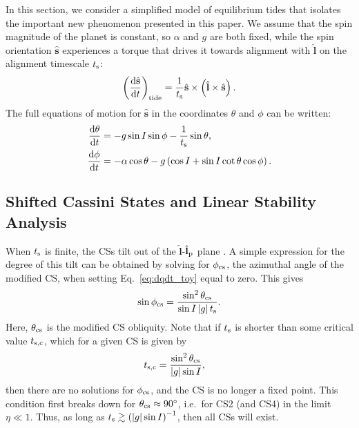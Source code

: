 \documentclass[
        fleqn,
        usenatbib,
    ]{mnras}
\newcommand*{\rd}[2]{\frac{\mathrm{d}#1}{\mathrm{d}#2}}
\newcommand*{\abs}[1]{\left|#1\right|}
\newcommand*{\p}[1]{\left(#1\right)}
\newcommand*{\uv}[1]{\hat{\mathbf{#1}}}
\begin{document}
In this section, we consider a simplified model of equilibrium tides that
isolates the important new phenomenon presented in this paper. We assume that
the spin magnitude of the planet is constant, so $\alpha$ and $g$ are both
fixed, while the spin orientation $\uv{s}$ experiences a torque that drives it
towards alignment with $\uv{l}$ on the alignment timescale $t_{\rm s}$:
\begin{equation}
    \p{\rd{\uv{s}}{t}}_{\rm tide}
        = \frac{1}{t_{\rm s}} \uv{s} \times \p{\uv{l} \times \uv{s}}.
\end{equation}
The full equations of motion for $\uv{s}$ in the coordinates $\theta$ and $\phi$
can be written:
\begin{align}
    \rd{\theta}{t} &= -g\sin I \sin \phi - \frac{1}{t_{\rm s}} \sin \theta,
        \label{eq:dqdt_toy}\\
    \rd{\phi}{t} &= -\alpha \cos\theta
        - g\p{\cos I + \sin I \cot \theta \cos \phi}.\label{eq:dfdt_toy}
\end{align}

\subsection{Shifted Cassini States and Linear Stability
Analysis}\label{ss:tidal_eqs}

When $t_{\rm s}$ is finite, the CSs tilt out of the $\uv{l}$-$\uv{l}_{\rm p}$
plane \citep[as was first pointed out for CS2 by][]{fabrycky_otides}. A simple
expression for the degree of this tilt can be obtained by solving for $\phi_{\rm
cs}$, the azimuthal angle of the modified CS, when setting Eq.~\eqref{eq:dqdt_toy} equal
to zero. This gives
\begin{equation}
    \sin \phi_{\rm cs} = \frac{\sin^2\theta_{\rm cs}}{\sin I \abs{g}t_{\rm s}}.
\end{equation}
Here, $\theta_{\rm cs}$ is the modified CS obliquity. Note that if $t_{\rm s}$
is shorter than some critical value $t_{\rm s, c}$, which for a given CS is
given by
\begin{align}
    t_{\rm s, c} &= \frac{\sin^2\theta_{\rm cs}}{\abs{g}\sin I},
\end{align}
then there are no solutions for $\phi_{\rm cs}$, and the CS is no longer a fixed
point. This condition first breaks down for $\theta_{\rm cs} \approx 90^\circ$,
i.e.\ for CS2 (and CS4) in the limit $\eta \ll 1$. Thus, as long as $t_{\rm s}
\gtrsim \p{\abs{g}\sin I}^{-1}$, then all CSs will exist.
\end{document}
